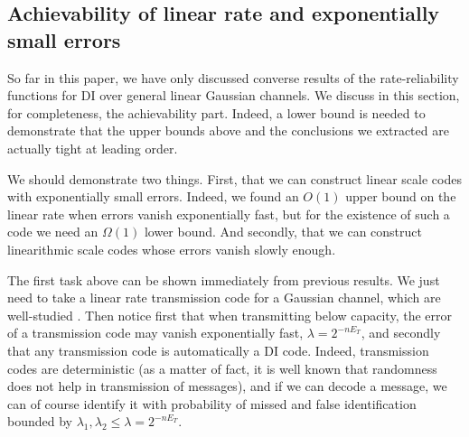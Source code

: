 \documentclass[10pt,conference]{IEEEtran}
\newtheorem{corollary}[theorem]{Corollary}
\newcommand{\1}{\mathds{1}}
\newcommand{\cG}{\mathcal{G}}
\newcommand{\pau}[1]{{\color{purple}#1}}
\begin{document}

\medskip
\subsection{Achievability of linear rate and exponentially small errors}
\label{ssec:achievability}
So far in this paper, we have only discussed converse results of the rate-reliability functions for DI over general linear Gaussian channels. We discuss in this section, for completeness, the achievability part. Indeed, a lower bound is needed to demonstrate that the upper bounds above and the conclusions we extracted are actually tight at leading order. 

We should demonstrate two things. First, that we can construct linear scale codes with exponentially small errors. Indeed, we found an $O(1)$ upper bound on the linear rate when errors vanish exponentially fast, but for the existence of such a code we need an $\Omega(1)$ lower bound. And secondly, that we can construct linearithmic scale codes whose errors vanish slowly enough.

The first task above can be shown immediately from previous results. We just need to take a linear rate transmission code for a Gaussian channel, which are well-studied \cite{CT_book,Gallager:Gauss_chapter}. Then notice first that when transmitting below capacity, the error of a transmission code may vanish exponentially fast, $\lambda=2^{-nE_T}$, and secondly that any transmission code is automatically a DI code. Indeed, transmission codes are deterministic (as a matter of fact, it is well known that randomness does not help in transmission of messages), and if we can decode a message, we can of course identify it with probability of missed and false identification bounded by $\lambda_1, \lambda_2 \leq \lambda = 2^{-nE_T}$. 
\end{document}
